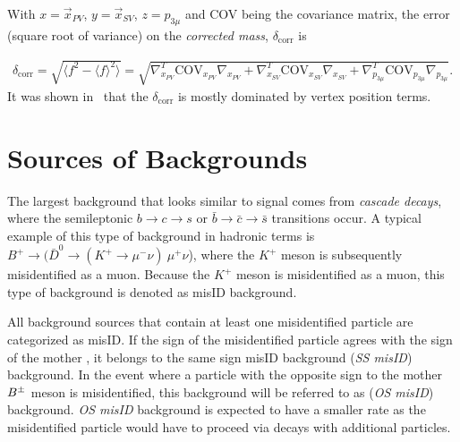 With $x=\vec{{x}}_{PV}$, $y=\vec{{x}}_{SV}$, $z=p_{3\mu}$ and \rm{COV} being the covariance matrix, the error (square root of variance) on the \emph{corrected mass}, $\delta_\mathrm{{corr}}$ is
%
%


\begin{equation}
\begin{aligned}
	\delta_\mathrm{{corr}} = \sqrt{ \langle f^{2}-\langle f \rangle^{2} \rangle} = \sqrt{\nabla^{T}_{x_{PV}} {\mathrm{COV}}_{x_{PV}} \nabla_{x_{PV}} + \nabla^{T}_{x_{SV}} {\mathrm{COV}}_{x_{SV}} \nabla_{x_{SV}} + \nabla^{T}_{p_{3\mu}} {\mathrm{COV}}_{p_{3\mu}} \nabla_{p_{3\mu}}}. 
\end{aligned}
\end{equation}
It was shown in~\cite{Egede:1694339} that the $\delta_\mathrm{{corr}}$ is mostly dominated by vertex position terms.

\section{Sources of Backgrounds}
\label{bkgquick}
The largest background that looks similar to signal comes from \textit{cascade decays}, where the semileptonic $b \rightarrow c \rightarrow s$ or $\bar{b} \rightarrow \bar{c} \rightarrow \bar{s}$ transitions occur. A typical example of this type of background in hadronic terms is $B^{+} \rightarrow (\bar{D}^{0} \rightarrow (K^{+} \rightarrow \mu^{-} \nu)\ \mu^{+} \nu$), where the $K^{+}$ meson is subsequently misidentified as a muon. Because the $K^{+}$ meson is misidentified as a muon, this type of background is denoted as misID background.

All background sources that contain at least one misidentified particle are categorized as misID. If the sign of the misidentified particle agrees with the sign of the mother \Bpm, it belongs to the same sign misID background (\textit{SS misID}) background. In the event where a particle with the opposite sign to the mother ${{B}^\pm}$ meson is misidentified, this background will be referred to as (\textit{OS misID}) background. \textit{OS misID} background is expected to have a smaller rate as the misidentified particle would have to proceed via decays with additional particles.

